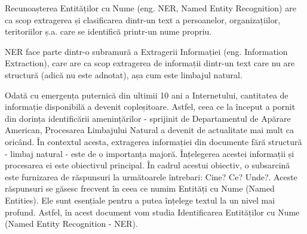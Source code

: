 
Recunoașterea Entităților cu Nume (eng. NER, Named Entity Recognition) are ca scop extragerea și clasificarea dintr-un text a persoanelor, organizațiilor, teritoriilor ș.a. care se identifică printr-un nume propriu.

NER face parte dintr-o subramură a Extragerii Informației (eng. Information Extraction), care are ca scop extragerea de informații dintr-un text care nu are structură (adică nu este adnotat), așa cum este limbajul natural.

Odată cu emergența puternică din ultimii 10 ani a Internetului, cantitatea de informație disponibilă a devenit copleșitoare. Astfel, ceea ce la început a pornit din dorința identificării amenințărilor - sprijinit de Departamentul de Apărare American, Procesarea Limbajului Natural a devenit de actualitate mai mult ca oricând. În contextul acesta, extragerea informației din documente fără structură - limbaj natural - este de o importanța majoră. Înțelegerea acestei informații și procesarea ei este obiectivul principal. În cadrul acestui obiectiv, o subsarcină este furnizarea de răspunsuri la următoarele întrebari: Cine? Ce? Unde?. Aceste răspunsuri se găsesc frecvent în ceea ce numim Entități cu Nume (Named Entities). Ele sunt esențiale pentru a putea înțelege textul la un nivel mai profund. Astfel, în acest document vom studia Identificarea Entităților cu Nume (Named Entity Recognition - NER).
